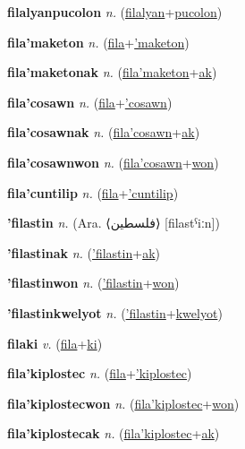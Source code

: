 \textbf{\hypertarget{filalyanpucolon}{filalyanpucolon}} \textit{n.} (\hyperlink{filalyan}{filalyan}+\allowbreak \hyperlink{pucolon}{pucolon})


\textbf{\hypertarget{fila'maketon}{fila'maketon}} \textit{n.} (\hyperlink{fila}{fila}+\allowbreak \hyperlink{'maketon}{'maketon})


\textbf{\hypertarget{fila'maketonak}{fila'maketonak}} \textit{n.} (\hyperlink{fila'maketon}{fila'maketon}+\allowbreak \hyperlink{ak}{ak})


\textbf{\hypertarget{fila'cosawn}{fila'cosawn}} \textit{n.} (\hyperlink{fila}{fila}+\allowbreak \hyperlink{'cosawn}{'cosawn})


\textbf{\hypertarget{fila'cosawnak}{fila'cosawnak}} \textit{n.} (\hyperlink{fila'cosawn}{fila'cosawn}+\allowbreak \hyperlink{ak}{ak})


\textbf{\hypertarget{fila'cosawnwon}{fila'cosawnwon}} \textit{n.} (\hyperlink{fila'cosawn}{fila'cosawn}+\allowbreak \hyperlink{won}{won})


\textbf{\hypertarget{fila'cuntilip}{fila'cuntilip}} \textit{n.} (\hyperlink{fila}{fila}+\allowbreak \hyperlink{'cuntilip}{'cuntilip})


\textbf{\hypertarget{'filastin}{'filastin}} \textit{n.} (Ara. ⟨{\arabics{}فلسطين}⟩ [filastˁiːn])


\textbf{\hypertarget{'filastinak}{'filastinak}} \textit{n.} (\hyperlink{'filastin}{'filastin}+\allowbreak \hyperlink{ak}{ak})


\textbf{\hypertarget{'filastinwon}{'filastinwon}} \textit{n.} (\hyperlink{'filastin}{'filastin}+\allowbreak \hyperlink{won}{won})


\textbf{\hypertarget{'filastinkwelyot}{'filastinkwelyot}} \textit{n.} (\hyperlink{'filastin}{'filastin}+\allowbreak \hyperlink{kwelyot}{kwelyot})


\textbf{\hypertarget{filaki}{filaki}} \textit{v.} (\hyperlink{fila}{fila}+\allowbreak \hyperlink{ki}{ki})


\textbf{\hypertarget{fila'kiplostec}{fila'kiplostec}} \textit{n.} (\hyperlink{fila}{fila}+\allowbreak \hyperlink{'kiplostec}{'kiplostec})


\textbf{\hypertarget{fila'kiplostecwon}{fila'kiplostecwon}} \textit{n.} (\hyperlink{fila'kiplostec}{fila'kiplostec}+\allowbreak \hyperlink{won}{won})


\textbf{\hypertarget{fila'kiplostecak}{fila'kiplostecak}} \textit{n.} (\hyperlink{fila'kiplostec}{fila'kiplostec}+\allowbreak \hyperlink{ak}{ak})


